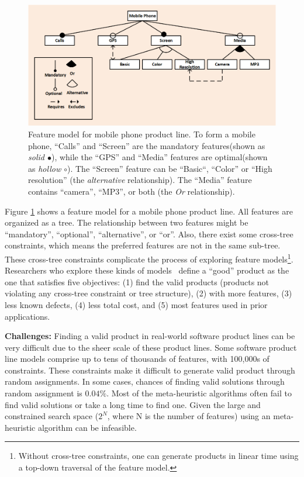\documentclass[sigconf,anonymous,review]{acmart}
\newcommand\TODO[1]{\textcolor{ScarletRed}{\textbf{\colorbox{yellow}{\small TODO:}} \emph{#1}}\xspace}
\begin{document}
    \begin{figure}[!t]
 \includegraphics[width=\linewidth]{img/ft.png}
\caption{Feature model for mobile phone product line. To form a mobile phone, ``Calls'' and ``Screen'' are the mandatory features(shown as \textit{solid $\bullet$}), while the ``GPS'' and ``Media'' features are optimal(shown as \textit{hollow $\circ$}). The ``Screen'' feature can be ``Basic``, ``Color'' or ``High resolution'' (the \textit{alternative} relationship). The ``Media'' feature contains ``camera'', ``MP3'', or both (the \textit{Or} relationship).}
\label{fig:mobile}
\end{figure}


Figure \ref{fig:mobile} shows a feature model for a mobile phone
product line. All features are organized as a tree. The relationship
between two features might be ``mandatory'', ``optional'',
``alternative'', or ``or''. Also, there exist some cross-tree constraints, which means the preferred features are not in the same sub-tree. These cross-tree constraints complicate the process of exploring feature models\footnote{Without cross-tree constraints, one can generate products in linear time using a top-down traversal of the feature model.}. 
Researchers who explore these kinds of models~\cite{sayyad13a, sayyad13b, harman2014search, henard2015combining}
define a ``good'' product as the one that satisfies five objectives:
(1) find the valid products (products not violating any cross-tree constraint or tree structure), (2) with more features, (3) less known defects, (4) less total cost, and (5) most features used in prior applications.

\noindent\textbf{Challenges: } Finding a valid product in real-world software product lines can be very difficult due to the sheer scale of these product lines. Some software product line models comprise up to tens of thousands
of features,  with 100,000s of constraints. These constraints make it difficult to generate valid product through random assignments. In some cases, chances of finding valid solutions through random assignment is $0.04\%$. Most of the meta-heuristic algorithms often fail to find valid solutions or take a long time to find one. Given the large and constrained search space ($2^N$, where N is the number of features) using an meta-heuristic 
algorithm can be infeasible.
\end{document}

